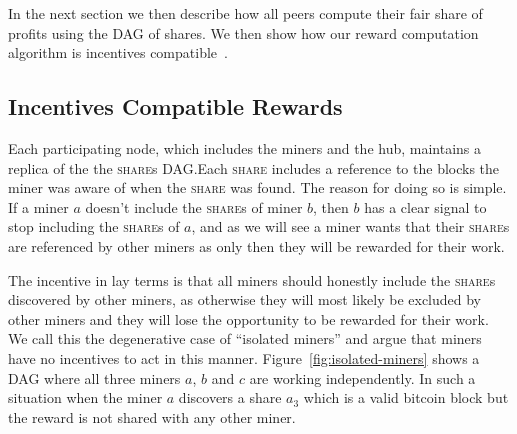 \documentclass{article}
\begin{document}
In the next section we then describe how all peers compute their fair
share of profits using the DAG of shares. We then show how our reward
computation algorithm is incentives
compatible~\cite{incentives-compatible}.

  
  
\subsection{Incentives Compatible Rewards}\label{sec:rewards}

Each participating node, which includes the miners and the hub,
maintains a replica of the the \textsc{share}s DAG.\@ Each
\textsc{share} includes a reference to the blocks the miner was aware
of when the \textsc{share} was found. The reason for doing so is
simple. If a miner $a$ doesn't include the \textsc{share}s of miner
$b$, then $b$ has a clear signal to stop including the \textsc{share}s
of $a$, and as we will see a miner wants that their \textsc{share}s
are referenced by other miners as only then they will be rewarded for
their work.

The incentive in lay terms is that all miners should honestly include
the \textsc{share}s discovered by other miners, as otherwise they will
most likely be excluded by other miners and they will lose the
opportunity to be rewarded for their work. We call this the
degenerative case of ``isolated miners'' and argue that miners have no
incentives to act in this manner. Figure~\ref{fig:isolated-miners}
shows a DAG where all three miners $a$, $b$ and $c$ are working
independently. In such a situation when the miner $a$ discovers a
share $a_3$ which is a valid bitcoin block but the reward is not
shared with any other miner.
\end{document}

